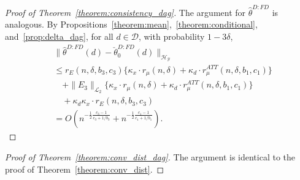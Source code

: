 \begin{proof}[Proof of Theorem~\ref{theorem:consistency_dag}]
  The argument for $\hat{\theta}^{D:FD}$ is analogous. By Propositions~\ref{theorem:mean},~\ref{theorem:conditional}, and~\ref{prop:delta_dag}, for all $d\in\mathcal{D}$, with probability $1-3\delta$,
   \begin{align*}
       &\|\hat{\theta}^{D:FD}(d)-\check{\theta}_0^{D:FD}(d)\|_{\mathcal{H}_{\mathcal{Y}}}
      \\
      &\leq r_{E}(n,\delta,b_3,c_3)\{\kappa_x \cdot r_{\mu} (n,\delta)+\kappa_d\cdot   r^{ATT}_{\mu}(n,\delta,b_1,c_1)\} \\
      &\quad +\|E_3\|_{\mathcal{L}_2}\{\kappa_x \cdot r_{\mu} (n,\delta)+\kappa_d\cdot   r^{ATT}_{\mu}(n,\delta,b_1,c_1)\}\\
      &\quad +\kappa_d\kappa_x\cdot r_{E}(n,\delta,b_3,c_3) \\
      &=O\left(n^{-\frac{1}{2}\frac{c_3-1}{c_3+1/b_3}}+n^{-\frac{1}{2}\frac{c_1-1}{c_1+1/b_1}}\right).
   \end{align*}
\end{proof}

\begin{proof}[Proof of Theorem~\ref{theorem:conv_dist_dag}]
The argument is identical to the proof of Theorem~\ref{theorem:conv_dist}.
\end{proof}